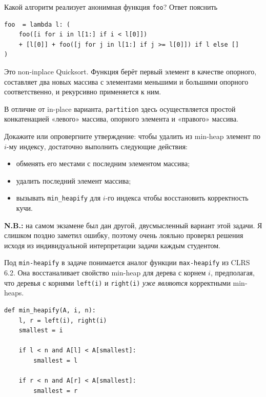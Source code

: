 \documentclass[12pt]{exam}
\begin{document}
\begin{questions}
\begin{solution}
\end{solution}



\question[3] Какой алгоритм реализует анонимная функция {\tt foo}? Ответ пояснить

\begin{verbatim}
foo  = lambda l: (
    foo([i for i in l[1:] if i < l[0]])
    + [l[0]] + foo([j for j in l[1:] if j >= l[0]]) if l else []
)
\end{verbatim}

\begin{solution}
Это non-inplace Quicksort. Функция берёт первый элемент в качестве опорного, составляет два новых массива с элементами меньшими и большими опорного соответственно, и рекурсивно применяется к ним.

В отличие от in-place варианта, {\tt partition} здесь осуществляется простой конкатенацией «левого» массива, опорного элемента и «правого» массива.
\end{solution}

\question[4] Докажите или опровергните утверждение: чтобы удалить из min-heap элемент по $i$-му индексу, достаточно выполнить следующие действия:
\begin{itemize}
    \item обменять его местами с последним элементом массива;
    \item удалить последний элемент массива;
    \item вызывать {\tt min\_heapify} для $i$-го индекса чтобы восстановить корректность кучи.
\end{itemize}

\begin{solution}
{\bf N.B.:} на самом экзамене был дан другой, двусмысленный вариант этой задачи. Я слишком поздно заметил ошибку, поэтому очень лояльно проверял решения исходя из индивидуальной интерпретации задачи каждым студентом.

Под {\tt min-heapify} в задаче понимается аналог функции {\tt max-heapify} из CLRS 6.2. Она восстаналивает свойство min-heap для дерева с корнем $i$, предполагая, что деревья с корнями {\tt left(i)} и {\tt right(i)} {\it уже являются} корректными min-heaps. 

\begin{verbatim}
def min_heapify(A, i, n):
    l, r = left(i), right(i)
    smallest = i

    if l < n and A[l] < A[smallest]:
        smallest = l

    if r < n and A[r] < A[smallest]:
        smallest = r


\end{verbatim}
\end{solution}
\end{questions}
\end{document}
